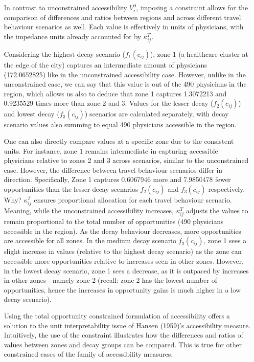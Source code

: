 \documentclass[
11pt, %
oneside, %
english, %
singlespacing, %
]{macthesis} %
\begin{document}


In contrast to unconstrained accessibility \(V^0_i\), imposing a constraint allows for the comparison of differences and ratios between regions and across different travel behaviour scenarios as well. Each value is effectively in units of physicians, with the impedance units already accounted for by \(\kappa_{ij}^T\).

Considering the highest decay scenario (\(f_1(c_{ij})\)), zone 1 (a healthcare cluster at the edge of the city) captures an intermediate amount of physicians (172.0652825) like in the unconstrained accessibility case. However, unlike in the unconstrained case, we can say that this value is out of the 490 physicians in the region, which allows us also to deduce that zone 1 captures 1.3072213 and 0.9235529 times more than zone 2 and 3. Values for the lesser decay (\(f_2(c_{ij})\)) and lowest decay (\(f_3(c_{ij})\)) scenarios are calculated separately, with decay scenario values also summing to equal 490 physicians accessible in the region.

One can also directly compare values at a specific zone due to the consistent units. For instance, zone 1 remains intermediate in capturing accessible physicians relative to zones 2 and 3 across scenarios, similar to the unconstrained case. However, the difference between travel behaviour scenarios differ in direction. Specifically, Zone 1 captures 0.6067946 more and 7.9850478 fewer opportunities than the lesser decay scenarios \(f_2(c_{ij})\) and \(f_3(c_{ij})\) respectively. Why? \(\kappa_{ij}^T\) ensures proportional allocation for each travel behaviour scenario. Meaning, while the unconstrained accessibility increases, \(\kappa_{ij}^T\) adjusts the values to remain proportional to the total number of opportunities (490 physicians accessible in the region). As the decay behaviour decreases, more opportunities are accessible for all zones. In the medium decay scenario \(f_2(c_{ij})\), zone 1 sees a slight increase in values (relative to the highest decay scenario) as the zone can accessible more opportunities relative to increases seen in other zones. However, in the lowest decay scenario, zone 1 sees a decrease, as it is outpaced by increases in other zones - namely zone 2 (recall: zone 2 has the lowest number of opportunities, hence the increases in opportunity gains is much higher in a low decay scenario).

Using the total opportunity constrained formulation of accessibility offers a solution to the unit interpretability issue of Hansen (1959)'s accessibility measure. Intuitively, the use of the constraint illustrates how the differences and ratios of values between zones and decay groups can be compared. This is true for other constrained cases of the family of accessibility measures.
\end{document}
